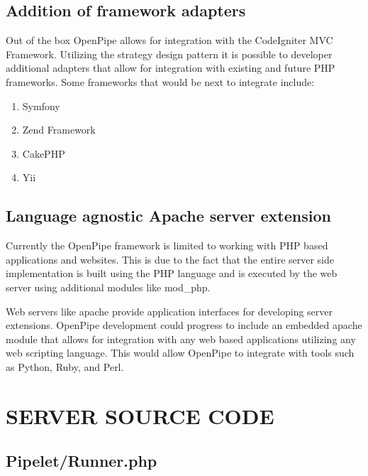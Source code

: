 \documentclass[12pt]{report}
\renewcommand{\cftchappresnum}{CHAPTER }
\newcommand{\rootPath}{../../}
\newcommand{\rootServerPath}{\rootPath server/}
\newcommand{\rootServerPhpPath}{\rootServerPath php/}
\newcommand{\phplist}[1]{}
\begin{document}
\section{Addition of framework adapters}
Out of the box OpenPipe allows for integration with the CodeIgniter MVC Framework. Utilizing the strategy design pattern it is possible to developer additional adapters that allow for integration with existing and future PHP frameworks. Some frameworks that would be next to integrate include:

\begin{enumerate}
	\item Symfony
	\item Zend Framework
	\item CakePHP
	\item Yii
\end{enumerate}

\section{Language agnostic Apache server extension}
Currently the OpenPipe framework is limited to working with PHP based applications and websites. This is due to the fact that the entire server side implementation is built  using the PHP language and is executed by the web server using additional modules like mod\_php. 

Web servers like apache provide application interfaces for developing server extensions. OpenPipe development could progress to include an embedded apache module that allows for integration with any web based applications utilizing any web scripting language. This would allow OpenPipe to integrate with tools such as Python, Ruby, and Perl.




\appendix
\addtocontents{toc}{\def\protect\cftchappresnum{APPENDIX }}

\chapter{SERVER SOURCE CODE}
\section{Pipelet/Runner.php}
\phplist{OpenPipe/Runner.php}
\end{document}
